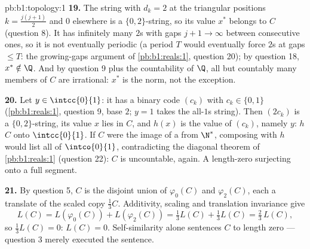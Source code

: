\begin{solution}{pb:b1:topology:1}
\textbf{19.} The string with $d_k = 2$ at the triangular
positions $k = \frac{j(j+1)}{2}$ and $0$ elsewhere is a
$\{0,2\}$-string, so its value $x^*$ belongs to $C$ (question
8). It has infinitely many $2$s with gaps $j + 1 \to \infty$
between consecutive ones, so it is not eventually periodic (a
period $T$ would eventually force $2$s at gaps $\leq T$: the
growing-gaps argument of \cref{pb:b1:reals:1}, question 20); by
question 18, $x^* \notin \Q$. And by question 9 plus the
countability of $\Q$, all but countably many members of $C$ are
irrational: $x^*$ is the norm, not the exception.

\textbf{20.} Let $y \in \intcc{0}{1}$: it has a binary code
$(c_k)$ with $c_k \in \{0, 1\}$ (\cref{pb:b1:reals:1}, question
9, base $2$; $y = 1$ takes the all-$1$s string). Then $(2c_k)$
is a $\{0,2\}$-string, its value $x$ lies in $C$, and $h(x)$ is
the value of $(c_k)$, namely $y$: $h$  $C$ onto
$\intcc{0}{1}$. If $C$ were the image of a  from $\N^*$,
composing with $h$ would list all of $\intco{0}{1}$,
contradicting the diagonal theorem of \cref{pb:b1:reals:1}
(question 22): $C$ is uncountable, again. A length-zero 
surjecting onto a full segment.

\textbf{21.} By question 5, $C$ is the disjoint union of
$\varphi_0(C)$ and $\varphi_2(C)$, each a translate of the
scaled copy $\frac13 C$. Additivity, scaling and translation
invariance give
\[
L(C) = L(\varphi_0(C)) + L(\varphi_2(C))
= \tfrac13 L(C) + \tfrac13 L(C) = \tfrac23\,L(C),
\]
so $\frac13 L(C) = 0$: $L(C) = 0$. Self-similarity alone
sentences $C$ to length zero --- question 3 merely executed the
sentence.


\end{solution}

